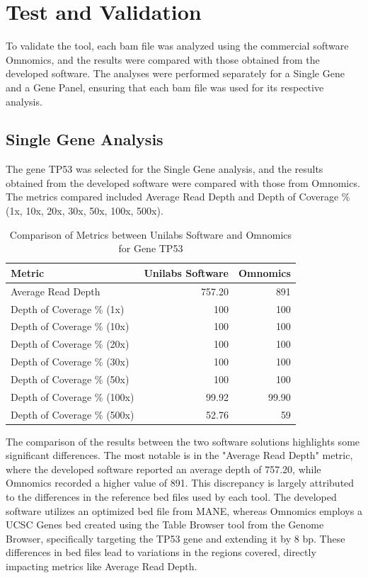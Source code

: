 \section{Test and Validation}

To validate the tool, each \ac{bam} file was analyzed using the commercial software Omnomics, and the results were compared with those obtained from the developed software. The analyses were performed separately for a Single Gene and a Gene Panel, ensuring that each \ac{bam} file was used for its respective analysis.

\subsection{Single Gene Analysis}

The gene TP53 was selected for the Single Gene analysis, and the results obtained from the developed software were compared with those from Omnomics. The metrics compared included Average Read Depth and Depth of Coverage \% (1x, 10x, 20x, 30x, 50x, 100x, 500x).

\begin{table}[]
    \centering
    \caption{Comparison of Metrics between Unilabs Software and Omnomics for Gene TP53}
    \label{tab:omnomicsVSunilabs}
    \begin{tabular}{lrr}
    \textbf{Metric}                      & \textbf{Unilabs Software} & \textbf{Omnomics} \\
    \hline
    Average Read Depth          & 757.20           & 891      \\
    Depth of Coverage \% (1x)   & 100              & 100      \\
    Depth of Coverage \% (10x)  & 100              & 100      \\
    Depth of Coverage \% (20x)  & 100              & 100      \\
    Depth of Coverage \% (30x)  & 100              & 100      \\
    Depth of Coverage \% (50x)  & 100              & 100      \\
    Depth of Coverage \% (100x) & 99.92            & 99.90     \\
    Depth of Coverage \% (500x) & 52.76            & 59      
    \end{tabular}
\end{table}

The comparison of the results between the two software solutions highlights some significant differences. The most notable is in the "Average Read Depth" metric, where the developed software reported an average depth of 757.20, while Omnomics recorded a higher value of 891. This discrepancy is largely attributed to the differences in the reference \ac{bed} files used by each tool. The developed software utilizes an optimized \ac{bed} file from MANE, whereas Omnomics employs a UCSC Genes \ac{bed} created using the Table Browser tool from the Genome Browser, specifically targeting the TP53 gene and extending it by 8 \ac{bp}. These differences in \ac{bed} files lead to variations in the regions covered, directly impacting metrics like Average Read Depth.

